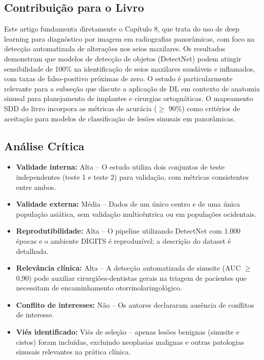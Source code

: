 \subsection{Contribuição para o Livro}
Este artigo fundamenta diretamente o Capítulo 8, que trata do uso de deep
learning para diagnóstico por imagem em radiografias panorâmicas, com foco
na detecção automatizada de alterações nos seios maxilares. Os resultados
demonstram que modelos de detecção de objetos (DetectNet) podem atingir
sensibilidade de 100\% na identificação de seios maxilares saudáveis e
inflamados, com taxas de falso-positivo próximas de zero. O estudo é
particularmente relevante para a subseção que discute a aplicação de DL
em contexto de anatomia sinusal para planejamento de implantes e cirurgias
ortognáticas. O mapeamento SDD do livro incorpora as métricas de acurácia
($\geq$ 90\%) como critérios de aceitação para modelos de classificação
de lesões sinusais em panorâmicas.

\subsection{Análise Crítica}
\begin{itemize}
  \item \textbf{Validade interna:} Alta -- O estudo utiliza dois conjuntos de
        teste independentes (teste 1 e teste 2) para validação, com métricas
        consistentes entre ambos.
  \item \textbf{Validade externa:} Média -- Dados de um único centro e de uma
        única população asiática, sem validação multicêntrica ou em populações
        ocidentais.
  \item \textbf{Reprodutibilidade:} Alta -- O pipeline utilizando DetectNet
        com 1.000 épocas e o ambiente DIGITS é reproduzível; a descrição do
        dataset é detalhada.
  \item \textbf{Relevância clínica:} Alta -- A detecção automatizada de
        sinusite (AUC $\geq$ 0,90) pode auxiliar cirurgiões-dentistas gerais
        na triagem de pacientes que necessitam de encaminhamento
        otorrinolaringológico.
  \item \textbf{Conflito de interesses:} Não -- Os autores declararam ausência
        de conflitos de interesse.
  \item \textbf{Viés identificado:} Viés de seleção -- apenas lesões
        benignas (sinusite e cistos) foram incluídas, excluindo neoplasias
        malignas e outras patologias sinusais relevantes na prática clínica.
\end{itemize}

